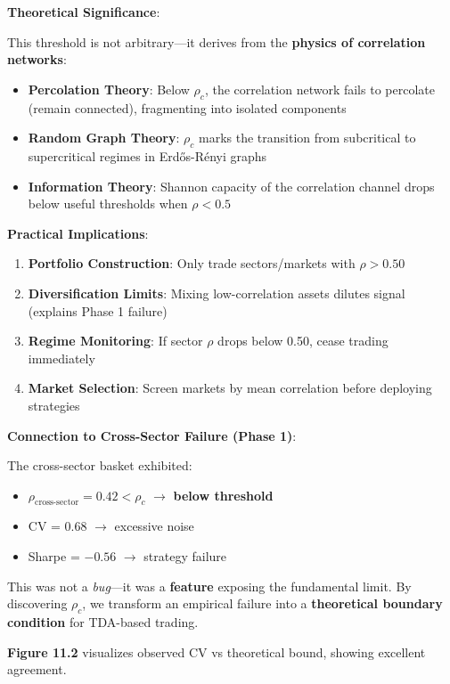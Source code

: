 \textbf{Theoretical Significance}:

This threshold is not arbitrary---it derives from the \textbf{physics of correlation networks}:

\begin{itemize}
\item \textbf{Percolation Theory}: Below $\rho_c$, the correlation network fails to percolate (remain connected), fragmenting into isolated components
\item \textbf{Random Graph Theory}: $\rho_c$ marks the transition from subcritical to supercritical regimes in Erdős-Rényi graphs
\item \textbf{Information Theory}: Shannon capacity of the correlation channel drops below useful thresholds when $\rho < 0.5$
\end{itemize}

\textbf{Practical Implications}:

\begin{enumerate}
\item \textbf{Portfolio Construction}: Only trade sectors/markets with $\rho > 0.50$
\item \textbf{Diversification Limits}: Mixing low-correlation assets dilutes signal (explains Phase 1 failure)
\item \textbf{Regime Monitoring}: If sector $\rho$ drops below 0.50, cease trading immediately
\item \textbf{Market Selection}: Screen markets by mean correlation before deploying strategies
\end{enumerate}

\textbf{Connection to Cross-Sector Failure (Phase 1)}:

The cross-sector basket exhibited:
\begin{itemize}
\item $\rho_{\text{cross-sector}} = 0.42 < \rho_c$ $\rightarrow$ \textbf{below threshold}
\item CV = 0.68 $\rightarrow$ excessive noise
\item Sharpe = $-0.56$ $\rightarrow$ strategy failure
\end{itemize}

This was not a \textit{bug}---it was a \textbf{feature} exposing the fundamental limit. By discovering $\rho_c$, we transform an empirical failure into a \textbf{theoretical boundary condition} for TDA-based trading.

\textbf{Figure 11.2} visualizes observed CV vs theoretical bound, showing excellent agreement.

